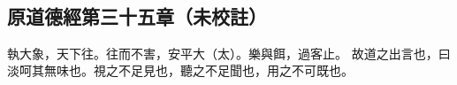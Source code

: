 ﻿%
%

\chapter{~}

\section{原道德經第三十五章（未校註）}

\begin{withgezhu}

\zhsong


執大象，天下往。往而不害，安平大（\textcolor{tongjia-color}{太}）。樂與餌，過客止。
故道之出言也，曰淡呵其無味也。視之不足見也，聽之不足聞也，用之不可既也。

\end{withgezhu}
